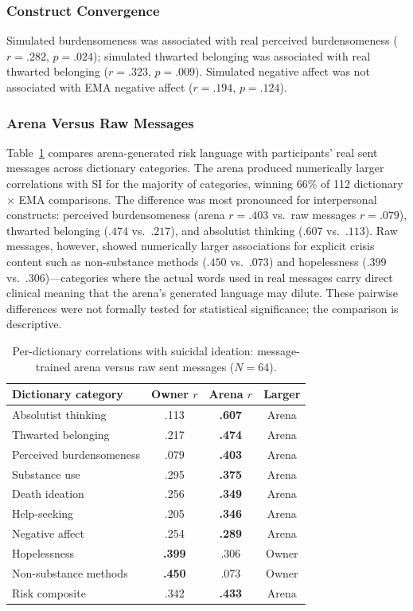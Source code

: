 \documentclass[review,12pt,authoryear]{elsarticle}
\begin{document}
\subsubsection{Construct Convergence}

Simulated burdensomeness was associated with real perceived burdensomeness ($r = .282$, $p = .024$); simulated thwarted belonging was associated with real thwarted belonging ($r = .323$, $p = .009$). Simulated negative affect was not associated with EMA negative affect ($r = .194$, $p = .124$).

\subsubsection{Arena Versus Raw Messages}

Table~\ref{tab:arena_vs_raw} compares arena-generated risk language with participants' real sent messages across dictionary categories. The arena produced numerically larger correlations with SI for the majority of categories, winning 66\% of 112 dictionary $\times$ EMA comparisons. The difference was most pronounced for interpersonal constructs: perceived burdensomeness (arena $r = .403$ vs.\ raw messages $r = .079$), thwarted belonging ($.474$ vs.\ $.217$), and absolutist thinking ($.607$ vs.\ $.113$). Raw messages, however, showed numerically larger associations for explicit crisis content such as non-substance methods ($.450$ vs.\ $.073$) and hopelessness ($.399$ vs.\ $.306$)---categories where the actual words used in real messages carry direct clinical meaning that the arena's generated language may dilute. These pairwise differences were not formally tested for statistical significance; the comparison is descriptive.

\begin{table}[H]
\centering
\caption{Per-dictionary correlations with suicidal ideation: message-trained arena versus raw sent messages ($N = 64$).}
\label{tab:arena_vs_raw}
\small
\begin{tabular}{lccc}
\toprule
Dictionary category & Owner $r$ & Arena $r$ & Larger \\
\midrule
Absolutist thinking & .113 & \textbf{.607} & Arena \\
Thwarted belonging & .217 & \textbf{.474} & Arena \\
Perceived burdensomeness & .079 & \textbf{.403} & Arena \\
Substance use & .295 & \textbf{.375} & Arena \\
Death ideation & .256 & \textbf{.349} & Arena \\
Help-seeking & .205 & \textbf{.346} & Arena \\
Negative affect & .254 & \textbf{.289} & Arena \\
Hopelessness & \textbf{.399} & .306 & Owner \\
Non-substance methods & \textbf{.450} & .073 & Owner \\
\midrule
Risk composite & .342 & \textbf{.433} & Arena \\
\bottomrule
\end{tabular}
\end{table}
\end{document}
